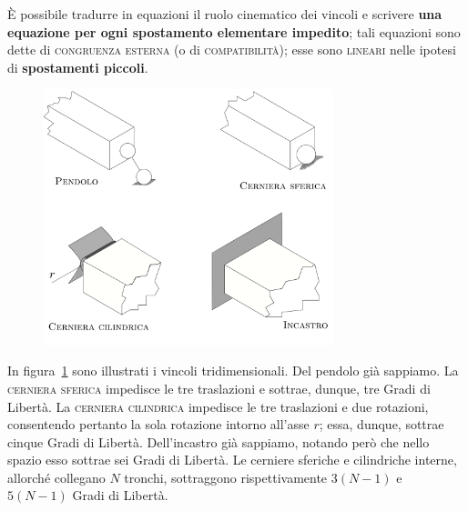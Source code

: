 \noindent È possibile tradurre in equazioni il ruolo cinematico dei vincoli e scrivere \textbf{una equazione per ogni spostamento elementare impedito}; tali equazioni sono dette di \textsc{congruenza esterna} (o di \textsc{compatibilità}); esse sono \textsc{lineari} nelle ipotesi di \textbf{spostamenti piccoli}. 
\renewcommand{\thefigure}{7~-~2}
\begin{figure}[ht]
\centering
\includegraphics[width=0.75\textwidth]{Immagini/Parte_7/Figura7_2/Figura7_2.pdf}
\caption{}
\label{figura7-2}
\end{figure}

\noindent In figura~\ref{figura7-2} sono illustrati i vincoli tridimensionali. Del pendolo già sappiamo. La \textsc{cerniera sferica} impedisce le tre traslazioni e sottrae, dunque, tre Gradi di Libertà. La \textsc{cerniera cilindrica} impedisce le tre traslazioni e due rotazioni, consentendo pertanto la sola rotazione intorno all'asse $r$; essa, dunque, sottrae cinque Gradi di Libertà. Dell'incastro già sappiamo, notando però che nello spazio esso sottrae sei Gradi di Libertà. Le cerniere sferiche e cilindriche interne, allorché collegano $N$ tronchi, sottraggono rispettivamente $3(N-1)$ e $5(N-1)$ Gradi di Libertà.
